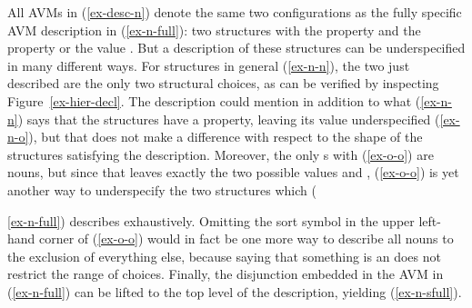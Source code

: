 \documentclass[output=paper
                ,modfonts
                ,nonflat
	        ,collection
	        ,collectionchapter
	        ,collectiontoclongg
 	        ,biblatex
                ,babelshorthands
                ,newtxmath
                ,draftmode
                ,colorlinks, citecolor=brown
]{./langsci/langscibook}
\begin{document}
{\begin{exe}
\begin{xlist}
  \end{xlist}
\end{exe}

All AVMs in (\ref{ex-desc-n}) denote the same two configurations as
the fully specific AVM description in (\ref{ex-n-full}): two
 structures with the  property  and
the  property  or the  value
. But a description of these structures can be
underspecified in many different ways. For  structures in
general (\ref{ex-n-n}), the two just described are the only two
structural choices, as can be verified by inspecting
Figure~\ref{ex-hier-decl}. The description could mention in addition
to what (\ref{ex-n-n}) says that
the structures have a  property, leaving its value
underspecified (\ref{ex-n-o}), but that does not make a difference
with respect to the shape of the structures satisfying the
description. Moreover, the only s with 
(\ref{ex-o-o}) are nouns, but since that leaves exactly the two possible
 values  and , (\ref{ex-o-o}) is
yet another way to underspecify the two structures which
({\ref{ex-n-full}) describes exhaustively. Omitting the sort
  symbol  in the upper left-hand corner of (\ref{ex-o-o})
  would in fact be one more way to describe all nouns to the exclusion of
  everything else,
  because saying that something is an  does not restrict
  the range of choices. Finally, the disjunction
  embedded in the AVM in (\ref{ex-n-full}) can be lifted to
the top level of the description, yielding (\ref{ex-n-sfull}).


}}
\end{document}
